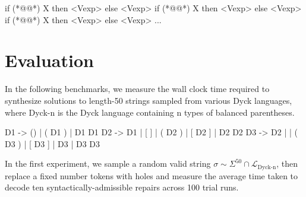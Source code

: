 \documentclass[sigplan,review,anonymous,acmsmall]{acmart}\settopmatter{printfolios=false,printccs=false,printacmref=false}
\begin{document}
\begin{tidyoutput}
if (*@@*) X then <Vexp> else <Vexp>
if (*@@*) X then <Vexp> else <Vexp>
if (*@@*) X then <Vexp> else <Vexp>
...
\end{tidyoutput}

%


\section{Evaluation}

In the following benchmarks, we measure the wall clock time required to synthesize solutions to length-50 strings sampled from various Dyck languages, where Dyck-n is the Dyck language containing n types of balanced parentheses.

\begin{tidyinput}
D1 -> () | ( D1 ) | D1 D1
D2 -> D1 | [ ] | ( D2 ) | [ D2 ] | D2 D2
D3 -> D2 | { } | ( D3 ) | [ D3 ] | { D3 } | D3 D3
\end{tidyinput}

\noindent In the first experiment, we sample a random valid string $\sigma \sim \Sigma^{50} \cap \mathcal{L}_{\text{Dyck-n}}$, then replace a fixed number tokens with holes and measure the average time taken to decode ten syntactically-admissible repairs across 100 trial runs.

\end{document}
